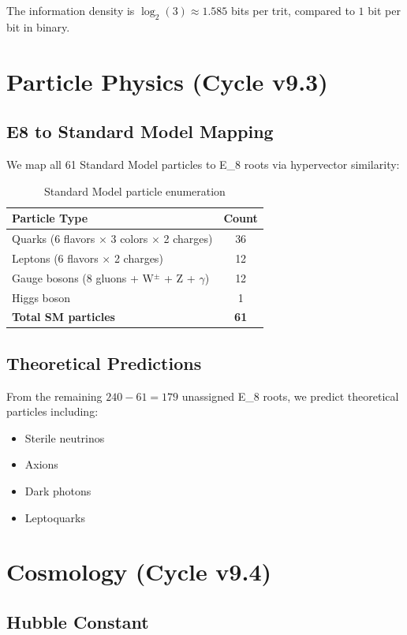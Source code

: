 \documentclass[12pt,a4paper]{article}
\newcommand{\EIGHT}{{\rm E}_8}
\begin{document}
The information density is $\log_2(3) \approx 1.585$ bits per trit, compared to $1$ bit per bit in binary.

\section{Particle Physics (Cycle v9.3)}

\subsection{E8 to Standard Model Mapping}

We map all 61 Standard Model particles to \EIGHT{} roots via hypervector similarity:

\begin{table}[h]
\centering
\begin{tabular}{lc}
\hline
\textbf{Particle Type} & \textbf{Count} \\
\hline
Quarks (6 flavors $\times$ 3 colors $\times$ 2 charges) & 36 \\
Leptons (6 flavors $\times$ 2 charges) & 12 \\
Gauge bosons (8 gluons + W$^\pm$ + Z + $\gamma$) & 12 \\
Higgs boson & 1 \\
\hline
\textbf{Total SM particles} & \textbf{61} \\
\hline
\end{tabular}
\caption{Standard Model particle enumeration}
\end{table}

\subsection{Theoretical Predictions}

From the remaining $240 - 61 = 179$ unassigned \EIGHT{} roots, we predict theoretical particles including:
\begin{itemize}
\item Sterile neutrinos
\item Axions
\item Dark photons
\item Leptoquarks
\end{itemize}

\section{Cosmology (Cycle v9.4)}

\subsection{Hubble Constant}
\end{document}

